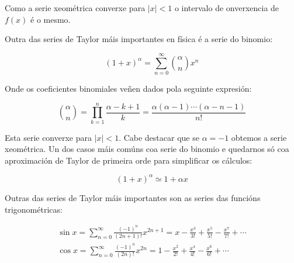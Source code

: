 \documentclass[a4paper,12pt,titlepage]{article}
\begin{document}
Como a serie xeométrica converxe para $|x|<1$ o intervalo de onverxencia de $f(x)$ é o mesmo.

\par Outra das series de Taylor máis importantes en física é a serie do binomio:

\begin{equation*}
    (1+x)^{\alpha} = \sum_{n=0}^{\infty} \binom{\alpha}{n} x^n 
\end{equation*}

Onde os coeficientes binomiales veñen dados pola seguinte expresión:

\begin{equation*}
    \binom{\alpha}{n} = \prod_{k=1}^{n} \frac{\alpha -k +1}{k} = \frac{\alpha(\alpha -1)\cdots(\alpha-n-1)}{n!}
\end{equation*}

Esta serie converxe para $|x|<1$. Cabe destacar que se $\alpha=-1$ obtemos a serie xeométrica. Un dos casos máis comúns coa serie do binomio e quedarnos só coa aproximación de Taylor de primeira orde para simplificar os cálculos:

\begin{equation*}
    (1+x)^{\alpha} \simeq 1 +\alpha x
\end{equation*}

Outras das series de Taylor máis importantes son as series das funcións trigonométricas:

\begin{equation*}
    \begin{gathered}
        \sin x = \sum_{n=0}^{\infty} \frac{\left (-1\right )^n}{(2n+1)!} x^{2n+1} = x - \frac{x^3}{3!} + \frac{x^5}{5!} - \frac{x^7}{7!} + \cdots \\
        \cos x = \sum_{n=0}^{\infty} \frac{\left (-1\right )^n}{(2n)!} x^{2n} = 1 - \frac{x^2}{2!} + \frac{x^4}{4!} - \frac{x^6}{6!} + \cdots
    \end{gathered}
\end{equation*}
\end{document}
